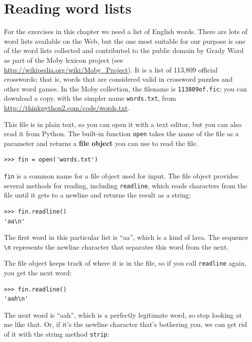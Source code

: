 \documentclass[10pt]{book}
\begin{document}
\section{Reading word lists}
\label{wordlist}

For the exercises in this chapter we need a list of English words.
There are lots of word lists available on the Web, but the one most
suitable for our purpose is one of the word lists collected and
contributed to the public domain by Grady Ward as part of the Moby
lexicon project (see \url{http://wikipedia.org/wiki/Moby_Project}).  It
is a list of 113,809 official crosswords; that is, words that are
considered valid in crossword puzzles and other word games.  In the
Moby collection, the filename is {\tt 113809of.fic}; you can download
a copy, with the simpler name {\tt words.txt}, from
\url{http://thinkpython2.com/code/words.txt}.

This file is in plain text, so you can open it with a text
editor, but you can also read it from Python.  The built-in
function {\tt open} takes the name of the file as a parameter
and returns a {\bf file object} you can use to read the file.

\begin{verbatim}
>>> fin = open('words.txt')
\end{verbatim}
%
{\tt fin} is a common name for a file object used for input.  The file
object provides several methods for reading, including {\tt readline},
which reads characters from the file until it gets to a newline and
returns the result as a string: 

\begin{verbatim}
>>> fin.readline()
'aa\n'
\end{verbatim}
%
The first word in this particular list is ``aa'', which is a kind of
lava.  The sequence \verb"\n" represents the newline character that 
separates this word from the next.

The file object keeps track of where it is in the file, so
if you call {\tt readline} again, you get the next word:

\begin{verbatim}
>>> fin.readline()
'aah\n'
\end{verbatim}
%
The next word is ``aah'', which is a perfectly legitimate
word, so stop looking at me like that.
Or, if it's the newline character that's bothering you,
we can get rid of it with the string method {\tt strip}:
\end{document}
